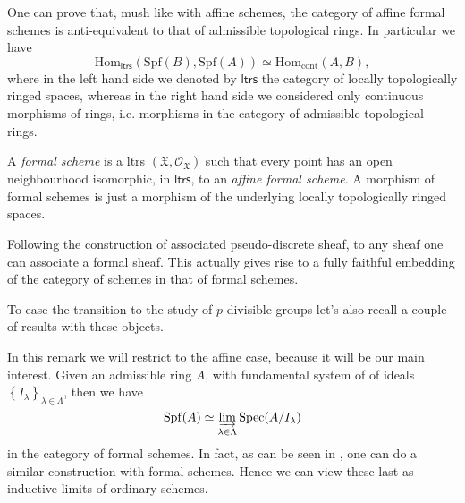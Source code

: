 \documentclass[../Main]{subfiles}
\begin{document}
\begin{rem}[]\label{EquivalenceFormalAffineSchemes}
	One can prove that, mush like with affine schemes, the category of affine
	formal schemes is anti-equivalent to that of admissible topological rings.
	In particular we have
	\begin{equation*}
	\mathrm{Hom}_{\mathsf{ltrs}} \left( \mathrm{Spf}(B), \mathrm{Spf}(A) \right) \simeq
	\mathrm{Hom}_{ \mathrm{cont} } \left( A, B \right)
	,\end{equation*}
	where in the left hand side we denoted by $\mathsf{ltrs}$ the category of
	locally topologically ringed spaces, whereas in the right hand side
	we considered only continuous morphisms of rings, i.e. morphisms
	in the category of admissible topological rings.
\end{rem}


\begin{defn}
	A {\em formal scheme} is a ltrs $( \mathfrak{X} , \mathcal{O}_{ \mathfrak{X} } )$
	such that every point has an open neighbourhood isomorphic,
	in $\mathsf{ltrs}$, to an {\em affine formal scheme}.
	A morphism of formal schemes is just a morphism of the underlying
	locally topologically ringed spaces.
\end{defn}


\begin{rem}[]
	Following the construction of associated pseudo-discrete sheaf,
	to any sheaf one can associate a formal sheaf.
	This actually gives rise to a fully faithful embedding of the category of schemes
	in that of formal schemes.
\end{rem}


To ease the transition to the study of $p$-divisible groups
let's also recall a couple of results with these objects.
\begin{rem}[]
	In this remark we will restrict to the affine case, because it will be
	our main interest.
	Given an admissible ring $A$, with fundamental system of
	of ideals $\left\{ I_\lambda \right\}_{\lambda \in \Lambda}$, then
	we have
	\begin{equation*}
	\mathrm{Spf}(A) \simeq \varinjlim_{\lambda \in \Lambda} \mathrm{Spec}(A/I_\lambda)
	\end{equation*}
	in the category of formal schemes.
	In fact, as can be seen in \cite[\S10.6]{EGA1}, one can do a similar construction
	with formal schemes.
	Hence we can view these last as inductive limits of ordinary schemes.
\end{rem}
\end{document}
